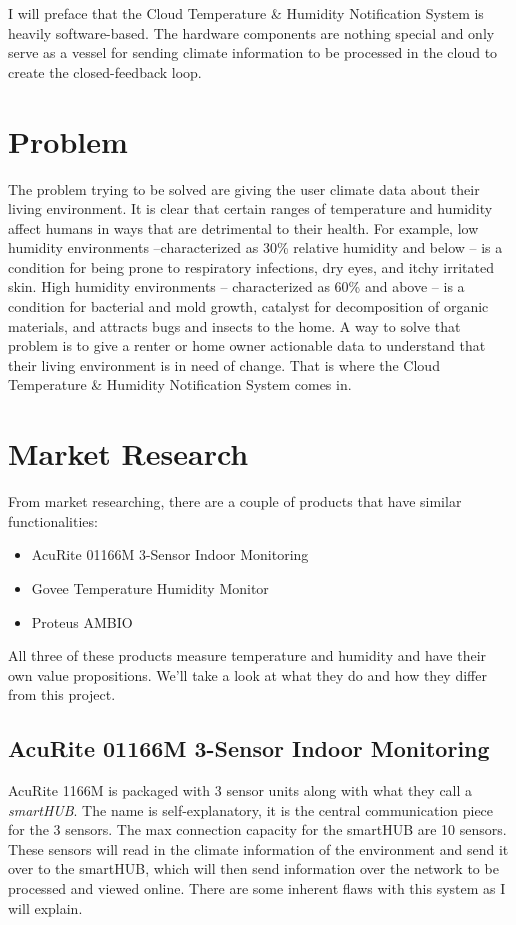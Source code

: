 \documentclass{article}
\begin{document}
I will preface that the Cloud Temperature \& Humidity Notification System is heavily software-based. The hardware components are nothing special and only serve as a vessel for sending climate information to be processed in the cloud to create the closed-feedback loop.

\section{Problem}
The problem trying to be solved are giving the user climate data about their living environment. It is clear that certain ranges of temperature and humidity affect humans in ways that are detrimental to their health. For example, low humidity environments --characterized as 30\% relative humidity and below -- is a condition for being prone to respiratory infections, dry eyes, and itchy irritated skin. High humidity environments -- characterized as 60\% and above -- is a condition for bacterial and mold growth, catalyst for decomposition of organic materials, and attracts bugs and insects to the home. A way to solve that problem is to give a renter or home owner actionable data to understand that their living environment is in need of change. That is where the Cloud Temperature \& Humidity Notification System comes in.

\section{Market Research}
From market researching, there are a couple of products that have similar functionalities:
\begin{itemize}
    \setlength{\itemindent}{3em}
    \setlength{\parskip}{0pt}
    \item AcuRite 01166M 3-Sensor Indoor Monitoring
    \item Govee Temperature Humidity Monitor
    \item Proteus AMBIO
\end{itemize}

All three of these products measure temperature and humidity and have their own value propositions. We'll take a look at what they do and how they differ from this project.

\subsection{AcuRite 01166M 3-Sensor Indoor Monitoring}
AcuRite 1166M is packaged with 3 sensor units along with what they call a \textit{smartHUB}. The name is self-explanatory, it is the central communication piece for the 3 sensors. The max connection capacity for the smartHUB are 10 sensors. These sensors will read in the climate information of the environment and send it over to the smartHUB, which will then send information over the network to be processed and viewed online. There are some inherent flaws with this system as I will explain.\\
\end{document}
